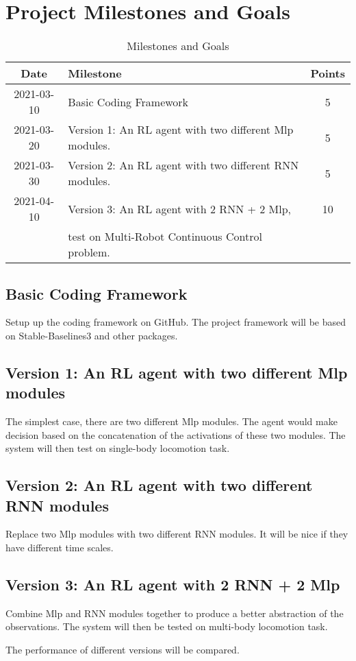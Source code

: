 



\section*{Project Milestones and Goals}

\begin{table}[h]
    \caption{Milestones and Goals}
    \centering
    \begin{tabular}{clc}
        \midrule\midrule
        Date       & Milestone & Points                                           \\
        \midrule\midrule
        2021-03-10 & Basic Coding Framework  & 5                    \\
        2021-03-20 & Version 1: An RL agent with two different Mlp modules. &5\\
        2021-03-30 & Version 2: An RL agent with two different RNN modules. &5\\
        2021-04-10 & Version 3: An RL agent with 2 RNN + 2 Mlp,             &10\\
                   & test on Multi-Robot Continuous Control problem.     &\\
        \midrule\midrule
    \end{tabular}
    \label{table:m0}
\end{table}

\subsection{Basic Coding Framework}

Setup up the coding framework on GitHub.
The project framework will be based on Stable-Baselines3 and other packages.

\subsection{Version 1: An RL agent with two different Mlp modules}

The simplest case, there are two different Mlp modules.
The agent would make decision based on the concatenation of the activations of these two modules.
The system will then test on single-body locomotion task.

\subsection{Version 2: An RL agent with two different RNN modules}

Replace two Mlp modules with two different RNN modules.
It will be nice if they have different time scales.

\subsection{Version 3: An RL agent with 2 RNN + 2 Mlp}

Combine Mlp and RNN modules together to produce a better abstraction of the observations.
The system will then be tested on multi-body locomotion task.

The performance of different versions will be compared.


